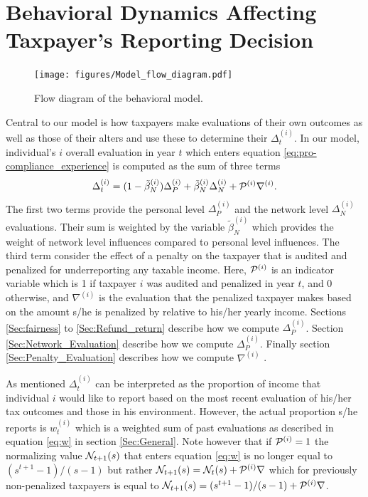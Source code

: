 \documentclass{NSF_proposal_mod}
\begin{document}
\section{Behavioral Dynamics Affecting Taxpayer's Reporting Decision}
\label{Sec:Evaluations}

\begin{figure}[!h]
\centering
 \texttt{[image: figures/Model\_flow\_diagram.pdf]} 
   \label{Fig:Model_flow_diagram}
\caption{Flow diagram of the behavioral model. }
\end{figure}

Central to our model is how taxpayers make evaluations of their own outcomes as well as those of their alters and use these to determine their $\Delta^{(i)}_t$. In our model, individual's $i$ overall evaluation in year $t$ which enters equation \ref{eq:pro-compliance_experience} is computed as the sum of three terms
\begin{equation}
\Delta_t^{(i)}= (1-\tilde{\beta}^{(i)}_N) \Delta_P^{(i)} +\tilde{\beta}^{(i)}_N \Delta_N^{(i)} + {\cal P}^{(i)}\nabla^{(i)} .
\end{equation}
The first two terms provide the personal level $\Delta_P^{(i)} $ and the network level $\Delta_N^{(i)}$ evaluations. Their sum is weighted by the variable $\tilde{\beta}^{(i)}_N$ which provides the weight of network level influences compared to personal level influences. The third term consider the effect of a penalty on the taxpayer that is audited and penalized for underreporting any taxable income.  Here,  ${\cal P}^{(i)}$ is an indicator variable which is 1 if taxpayer $i$ was audited and penalized in year $t$, and 0 otherwise, and $\nabla^{(i)}$ is the evaluation that the penalized taxpayer makes based on the amount s/he is penalized by relative to his/her yearly income. Sections \ref{Sec:fairness} to \ref{Sec:Refund_return} describe how we compute $\Delta_P^{(i)} $. Section \ref{Sec:Network_Evaluation} describe how we compute $\Delta_P^{(i)} $. Finally section \ref{Sec:Penalty_Evaluation} describes how we compute $\nabla^{(i)}$ . 

As mentioned $\Delta_t^{(i)}$ can be interpreted as the proportion of income that individual $i$ would like to report based on the most recent evaluation of his/her tax outcomes and those in his environment. However, the actual proportion s/he reports is $w^{(i)}_t$ which is a weighted sum of past evaluations as described in equation \ref{eq:w} in section \ref{Sec:General}.  Note however that if ${\cal P}^{(i)}=1$ the normalizing value  ${\cal N}_{t+1}(s)$ that enters equation \ref{eq:w} is no longer equal to $(s^{t+1}-1)/(s-1)$ but rather  ${\cal N}_{t+1}(s)= {\cal N}_{t}(s)+ {\cal P}^{(i)}\nabla$ which for previously non-penalized taxpayers is equal to ${\cal N}_{t+1}(s)= (s^{t+1}-1)/(s-1)+ {\cal P}^{(i)}\nabla$.
\end{document}
